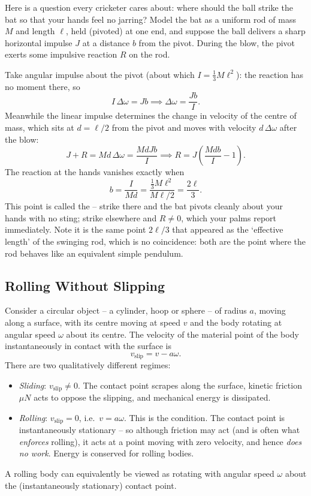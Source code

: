 \begin{example}
	Here is a question every cricketer cares about: where should the ball strike the bat so that your hands feel no jarring? Model the bat as a uniform rod of mass $M$ and length $\ell$, held (pivoted) at one end, and suppose the ball delivers a sharp horizontal impulse $J$ at a distance $b$ from the pivot. During the blow, the pivot exerts some impulsive reaction $R$ on the rod.

	Take angular impulse about the pivot (about which $I = \frac{1}{3}M\ell^2$): the reaction has no moment there, so
	$$
	I\, \Delta\omega = J b \implies \Delta \omega = \frac{Jb}{I}.
	$$
	Meanwhile the linear impulse determines the change in velocity of the centre of mass, which sits at $d = \ell/2$ from the pivot and moves with velocity $d\,\Delta\omega$ after the blow:
	$$
	J + R = M d\, \Delta\omega = \frac{MdJb}{I} \implies R = J\left(\frac{Mdb}{I} - 1\right).
	$$
	The reaction at the hands vanishes exactly when
	$$
	b = \frac{I}{Md} = \frac{\frac{1}{3}M\ell^2}{M \ell/2} = \frac{2\ell}{3}.
	$$
	This point is called the  -- strike there and the bat pivots cleanly about your hands with no sting; strike elsewhere and $R \neq 0$, which your palms report immediately. Note it is the same point $2\ell/3$ that appeared as the `effective length' of the swinging rod, which is no coincidence: both are the point where the rod behaves like an equivalent simple pendulum.
\end{example}

\subsection{Rolling Without Slipping}

Consider a circular object -- a cylinder, hoop or sphere -- of radius $a$, moving along a surface, with its centre moving at speed $v$ and the body rotating at angular speed $\omega$ about its centre. The velocity of the material point of the body instantaneously in contact with the surface is
$$
v_{\text{slip}} = v - a\omega.
$$
There are two qualitatively different regimes:
\begin{itemize}
	\item \emph{Sliding}: $v_{\text{slip}} \neq 0$. The contact point scrapes along the surface, kinetic friction $\mu N$ acts to oppose the slipping, and mechanical energy is dissipated.
	\item \emph{Rolling}: $v_{\text{slip}} = 0$, i.e.\ $v = a\omega$. This is the  condition. The contact point is instantaneously stationary -- so although friction may act (and is often what \emph{enforces} rolling), it acts at a point moving with zero velocity, and hence \emph{does no work}. Energy is conserved for rolling bodies.
\end{itemize}
A rolling body can equivalently be viewed as rotating with angular speed $\omega$ about the (instantaneously stationary) contact point.

